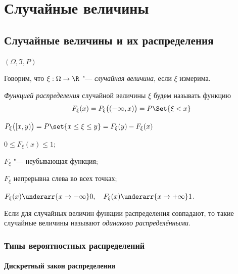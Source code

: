 \chapter{Случайные величины}

\section{Случайные величины и их распределения}

\begin{definition}
	$ (\Omega, \Im, P) $

	Говорим, что $ \xi : \Omega \to \R $ "--- \emph{случайная величина}, если $ \xi $ измерима.
\end{definition}

\begin{definition}
	\emph{Функцией распределения} случайной величины $ \xi $ будем называть функцию
	$$ F_\xi(x) = P_\xi \bigl( (-\infty, x) \bigr) = P \Set{\xi < x} $$
\end{definition}

\begin{remark}
	$ P_\xi \bigl( [x, y) \bigr) = P \set{x \le \xi \le y} = F_\xi(y) - F_\xi(x) $
\end{remark}

\begin{props}
\item $ 0 \le F_\xi(x) \le 1 $;
\item $ F_\xi $ "--- неубывающая функция;
\item $ F_\xi $ непрерывна слева во всех точках;
\item $ F_\xi(x) \underarr{x \to -\infty} 0, \quad F_\xi(x) \underarr{x \to +\infty} 1 $.
\end{props}

\begin{definition}
	Если для случайных величин функции распределения совпадают, то такие
	случайные величины называют \emph{одинаково распределёнными}.
\end{definition}

\subsection{Типы вероятностных распределений}

\subsubsection{Дискретный закон распределения}

